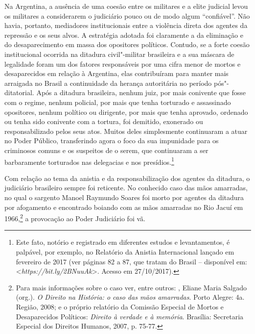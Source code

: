 Na Argentina, a ausência de uma coesão entre os militares e a elite
judicial levou os militares a considerarem o judiciário pouco ou de modo
algum ``confiável''. Não havia, portanto, mediadores institucionais
entre a violência direta dos agentes da repressão e os seus alvos. A
estratégia adotada foi claramente a da eliminação e do desaparecimento
em massa dos opositores políticos. Contudo, se a forte coesão
institucional ocorrida na ditadura civil"-militar brasileira e a sua
máscara de legalidade foram um dos fatores responsáveis por uma cifra
menor de mortos e desaparecidos em relação à Argentina, elas
contribuíram para manter mais arraigada no Brasil a continuidade da
herança autoritária no período pós"-ditatorial. Após a ditadura
brasileira, nenhum juiz, por mais conivente que fosse com o regime,
nenhum policial, por mais que tenha torturado e assassinado opositores,
nenhum político ou dirigente, por mais que tenha aprovado, ordenado ou
tenha sido conivente com a tortura, foi demitido, exonerado ou
responsabilizado pelos seus atos. Muitos deles simplesmente continuaram
a atuar no Poder Público, transferindo agora o foco da sua impunidade
para os criminosos comuns e os suspeitos de o serem, que continuaram a
ser barbaramente torturados nas delegacias e nos presídios.\footnote{Este
  fato, notório e registrado em diferentes estudos e levantamentos, é
  palpável, por exemplo, no Relatório da Anistia Internacional lançado
  em fevereiro de 2017 (ver páginas 82 a 87, que tratam do Brasil --
  disponível em: \textless{}\emph{https://bit.ly/2BNuuAk}\textgreater{}.
  Acesso em 27/10/2017).}

Com relação ao tema da anistia e da responsabilização dos agentes da
ditadura, o judiciário brasileiro sempre foi reticente. No conhecido
caso das mãos amarradas, no qual o sargento Manoel Raymundo Soares foi
morto por agentes da ditadura por afogamento e encontrado boiando com as
mãos amarradas no Rio Jacuí em 1966,\footnote{Para mais informações sobre
  o caso ver, entre outros: , Eliane Maria Salgado (org.).
  \emph{O Direito na História: o caso das mãos amarradas}. Porto
  Alegre:  4a. Região, 2008; e o próprio relatório da Comissão
  Especial de Mortos e Desaparecidos Políticos: \emph{Direito à verdade e à memória}.
  Brasília: Secretaria Especial dos Direitos Humanos, 2007, p. 75-77.} a
provocação ao Poder Judiciário foi vã.

